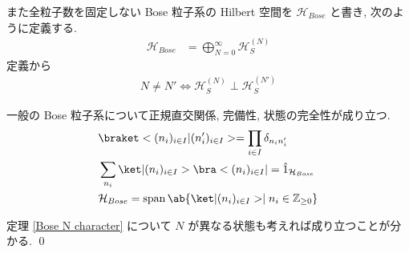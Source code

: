 \documentclass[uplatex,dvipdfmx,a4paper,11pt]{jlreq}
\makeatletter
\DeclareMathOperator{\Span}{span}
\newcommand{\ZZ}{\mathbb{Z}}
\newcommand{\HH}{\mathcal{H}}
\numberwithin{equation}{section}
\theoremstyle{definition}
\renewenvironment{proof}[1][\proofname]{\par
  \normalfont
  \topsep6\p@\@plus6\p@ \trivlist
  \item[\hskip\labelsep{\bfseries #1}\@addpunct{\bfseries}]\ignorespaces\quad\par
}{%
  \qed\endtrivlist\@endpefalse
}
\renewcommand\proofname{証明}
\makeatother
\begin{document}
\begin{definition}
  また全粒子数を固定しない Bose 粒子系の Hilbert 空間を $\HH_{Bose}$ と書き, 次のように定義する.
  \begin{align}
    \HH_{Bose} & = \bigoplus_{N=0}^\infty \HH_S^{(N)}
  \end{align}
  定義から
  \begin{align}
    N \neq N' \iff \HH_S^{(N)}\perp\HH_S^{(N')}
  \end{align}
\end{definition}
\begin{theorem}
  一般の Bose 粒子系について正規直交関係, 完備性, 状態の完全性が成り立つ.
  \begin{align}
     & \braket<(n_i)_{i\in I}|(n_i')_{i\in I}> = \prod_{i\in I}\delta_{n_in_i'}  \\
     & \sum_{n_i}\ket|(n_i)_{i\in I}>\bra<(n_i)_{i\in I}| = \hat{1}_{\HH_{Bose}} \\
     & \HH_{Bose} = \Span\ab\{\ket|(n_i)_{i\in I}> \mid n_i\in\ZZ_{\geq 0} \}
  \end{align}
\end{theorem}
\begin{proof}
  定理 \ref{Bose N character} について $N$ が異なる状態も考えれば成り立つことが分かる.
\end{proof}
\end{document}
